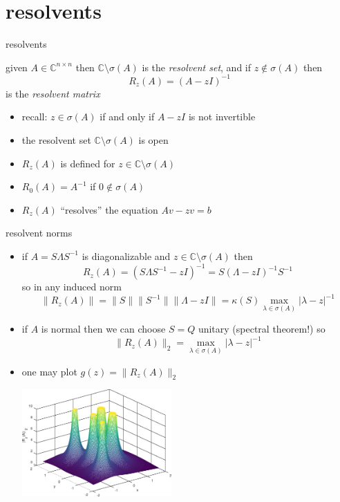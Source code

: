\documentclass[10pt,hyperref]{beamer}
\newcommand{\CC}{\mathbb{C}}
\begin{document}
\section{resolvents}

\begin{frame}{resolvents}

\begin{definition}
given $A\in\CC^{n\times n}$ then $\CC\setminus \sigma(A)$ is the \emph{resolvent set}, and if $z \notin \sigma(A)$ then
    $$R_z(A) = \left(A-z I\right)^{-1}$$
is the \emph{resolvent matrix}
\end{definition}

\begin{itemize}
\item recall: $z \in \sigma(A)$ if and only if $A-z I$ is not invertible
\item the resolvent set $\CC\setminus \sigma(A)$ is open
\item $R_z(A)$ is defined for $z \in \CC\setminus \sigma(A)$
\item $R_0(A)=A^{-1}$ if $0\notin\sigma(A)$
\item $R_z(A)$ ``resolves'' the equation $Av-z v=b$
\end{itemize}
\end{frame}


\begin{frame}{resolvent norms}

\begin{itemize}
\item if $A=S\Lambda S^{-1}$ is diagonalizable and $z\in \CC\setminus \sigma(A)$ then
    $$R_z(A) = \left(S\Lambda S^{-1}-z I\right)^{-1} = S \left(\Lambda - z I\right)^{-1} S^{-1}$$
so in any induced norm
    $$\|R_z(A)\| = \|S\|\|S^{-1}\|\|\Lambda - z I\| = \kappa(S) \max_{\lambda\in\sigma(A)} |\lambda-z|^{-1}$$
\item if $A$ is normal then we can choose $S=Q$ unitary (spectral theorem!) so
    $$\|R_z(A)\|_2 = \max_{\lambda\in\sigma(A)} |\lambda-z|^{-1}$$
\item one may plot $g(z)=\|R_z(A)\|_2$

\vspace{-5mm}
\hfill \includegraphics[width=0.45\textwidth]{figs/resolvesurf}
\end{itemize}
\end{frame}
\end{document}
